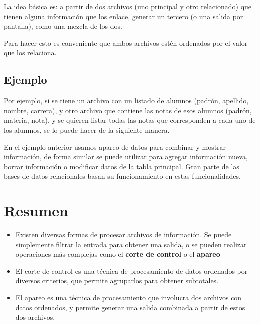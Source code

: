 La idea básica es: a partir de dos archivos (uno principal y otro
relacionado) que tienen alguna información que los enlace, generar un
tercero (o una salida por pantalla), como una mezcla de los dos.

Para hacer esto es conveniente que ambos archivos estén ordenados por el valor
que los relaciona. 

\subsection*{Ejemplo}

Por ejemplo, si se tiene un archivo con un listado de alumnos (padrón,
apellido, nombre, carrera), y otro archivo que contiene las notas de esos
alumnos (padrón, materia, nota), y se quieren listar todas las notas que
corresponden a cada uno de los alumnos, se lo puede hacer de la siguiente
manera.



En el ejemplo anterior usamos apareo de datos para combinar y mostrar
información, de forma similar se puede utilizar para agregar información nueva,
borrar información o modificar datos de la tabla principal. Gran parte de las
bases de datos relacionales basan su funcionamiento en estas funcionalidades.

\section{Resumen}

\begin{itemize}

\item Existen diversas formas de procesar archivos de información.  Se
puede simplemente filtrar la entrada para obtener una salida, o se pueden
realizar operaciones más complejas como el {\bf corte de control} o el {\bf
apareo}

\item El corte de control es una técnica de procesamiento de datos
ordenados por diversos criterios, que permite agruparlos para obtener
subtotales.

\item El apareo es una técnica de procesamiento que involucra dos archivos
con datos ordenados, y permite generar una salida combinada a partir de
estos dos archivos.

\end{itemize}

